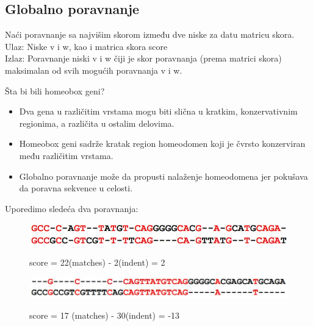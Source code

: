 \subsection{Globalno poravnanje}

\begin{problem}
	Naći poravnanje sa najvišim skorom između dve niske za datu matricu skora. \\
	Ulaz: Niske v i w, kao i matrica skora score \\
	Izlaz: Poravnanje niski v i w čiji je skor poravnanja (prema matrici skora) maksimalan od svih mogućih poravnanja v i w. 
\end{problem}

\noindent Šta bi bili homeobox geni? \\
\begin{itemize}
    \item Dva gena u različitim vrstama mogu biti slična u kratkim, konzervativnim regionima, a različita u ostalim delovima.
    \item Homeobox geni sadrže kratak region homeodomen koji je čvrsto konzerviran među različitim vrstama.
    \item Globalno poravnanje može da propusti nalaženje homeodomena jer pokušava da poravna sekvence u celosti.
\end{itemize}

\noindent Uporedimo sledeća dva poravnanja: \\
\begin{figure}[!htb]
 \begin{minipage}{0.49\textwidth}
    \includegraphics[width=\linewidth]{poglavlja/5/slike/globalno.JPG}
   \caption{}\label{}
   score = 22(matches) - 2(indent) = 2
 \end{minipage}
 \hfill
 \begin{minipage}{0.49\textwidth}
   \includegraphics[width=\linewidth]{poglavlja/5/slike/lokalno.JPG}
   \caption{}\label{}
   score = 17 (matches) - 30(indent) = -13
 \end{minipage}
\end{figure}
   

